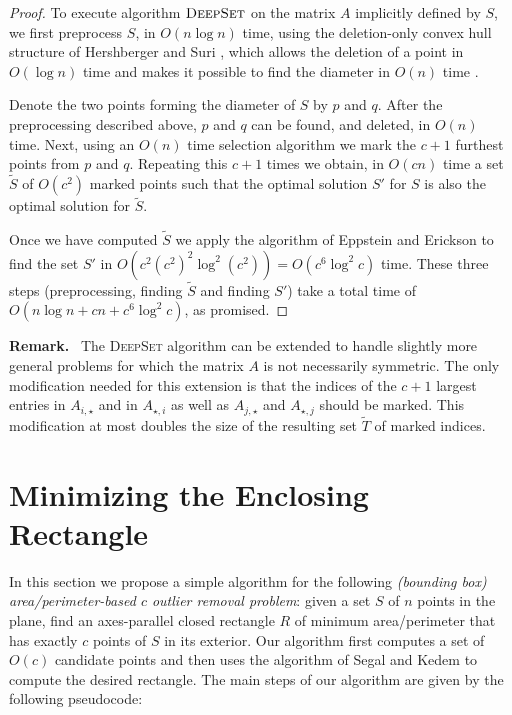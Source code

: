 \documentclass{elsart}
\renewcommand{\paragraph}[1]{\noindent\textbf{#1}\ }
\begin{document}
\begin{proof}
To execute algorithm $\textsc{DeepSet}$ on the matrix $A$ implicitly
defined by $S$, we first preprocess $S$, in $O(n\log n)$ time, using
the deletion-only convex hull structure of Hershberger and Suri
\cite{hs92}, which allows the deletion of a point in $O(\log n)$ time
and makes it possible to find the diameter in $O(n)$ time \cite{s78}.

Denote the two points forming the diameter of $S$ by $p$ and $q$.
After the preprocessing described above, $p$ and $q$ can be found, and
deleted, in $O(n)$ time.  Next, using an $O(n)$ time selection
algorithm we mark the $c+1$ furthest points from $p$ and $q$.
Repeating this $c+1$ times we obtain, in $O(cn)$ time a set
$\tilde{S}$ of $O(c^2)$ marked points such that the optimal solution
$S'$ for $S$ is also the optimal solution for $\tilde{S}$.

Once we have computed $\tilde{S}$ we apply the algorithm of Eppstein
and Erickson \cite{ee94} to find the set $S'$ in $O(c^2 (c^2)^2\log^2
(c^2)) = O(c^6\log^2 c)$ time.  These three steps (preprocessing,
finding $\tilde{S}$ and finding $S'$) take a total time of $O(n\log n
+ cn + c^6 \log^2 c)$, as promised.
\end{proof}

\paragraph{Remark.} The \textsc{DeepSet} algorithm can be extended to
handle slightly more general problems for which the matrix $A$ is not
necessarily symmetric.  The only modification needed for this
extension is that the indices of the $c+1$ largest entries in
$A_{i,\star}$ and in $A_{\star,i}$ as well as $A_{j,\star}$ and
$A_{\star,j}$ should be marked.  This modification at most doubles the
size of the resulting set $\tilde{T}$ of marked indices.

\section{Minimizing the Enclosing Rectangle}

In this section we propose a simple algorithm for the following
\emph{(bounding box) area/perimeter-based $c$ outlier removal
problem}: given a set $S$ of $n$ points in the plane, find an
axes-parallel closed rectangle $R$ of minimum area/perimeter that has
exactly $c$ points of $S$ in its exterior.  Our algorithm first
computes a set of $O(c)$ candidate points and then uses the algorithm
of Segal and Kedem \cite{sk98} to compute the desired rectangle.  The
main steps of our algorithm are given by the following pseudocode:
\end{document}
